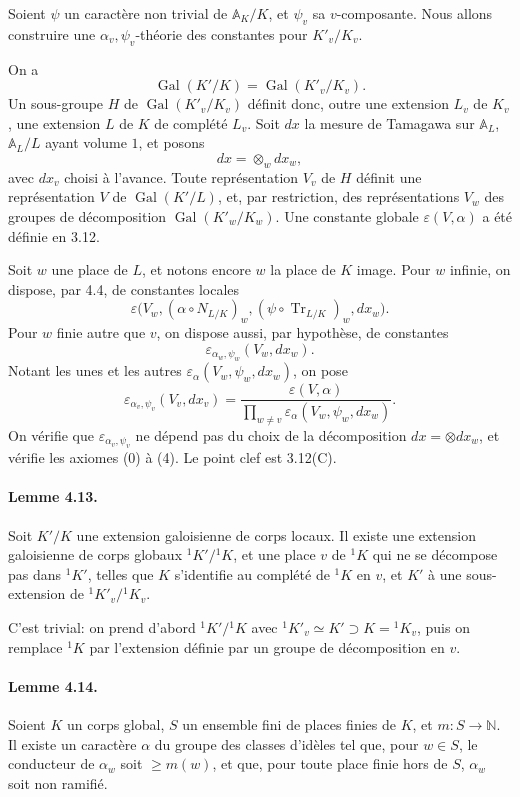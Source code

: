 \documentclass[10pt,letterpaper]{article}
\newcommand{\Gal}{\operatorname{Gal}}
\newcommand{\Tr}{\operatorname{Tr}}
\providecommand{\Gal}{\operatorname{Gal}}
\providecommand{\Gal}{\operatorname{Gal}}
\providecommand{\Tr}{\operatorname{Tr}}
\providecommand{\Gal}{\operatorname{Gal}}
\providecommand{\Tr}{\operatorname{Tr}}
\providecommand{\Gal}{\operatorname{Gal}}
\providecommand{\Tr}{\operatorname{Tr}}
\begin{document}
Soient \(\psi\) un caractère non trivial de \(\mathbb A_K/K\), et \(\psi_v\) sa \(v\)-composante. Nous allons construire une \(\alpha_v,\psi_v\)-théorie des constantes pour \(K'_v/K_v\).

On a
\[
\Gal(K'/K)=\Gal(K'_v/K_v).
\]
Un sous-groupe \(H\) de \(\Gal(K'_v/K_v)\) définit donc, outre une extension \(L_v\) de \(K_v\), une extension \(L\) de \(K\) de complété \(L_v\). Soit \(dx\) la mesure de Tamagawa sur \(\mathbb A_L\), \(\mathbb A_L/L\) ayant volume \(1\), et posons
\[
dx=\otimes_w dx_w,
\]
avec \(dx_v\) choisi à l'avance. Toute représentation \(V_v\) de \(H\) définit une représentation \(V\) de \(\Gal(K'/L)\), et, par restriction, des représentations \(V_w\) des groupes de décomposition \(\Gal(K'_w/K_w)\). Une constante globale \(\varepsilon(V,\alpha)\) a été définie en 3.12.

Soit \(w\) une place de \(L\), et notons encore \(w\) la place de \(K\) image. Pour \(w\) infinie, on dispose, par 4.4, de constantes locales
\[
\varepsilon\bigl(V_w,(\alpha\circ N_{L/K})_w,
(\psi\circ\Tr_{L/K})_w,dx_w\bigr).
\]
Pour \(w\) finie autre que \(v\), on dispose aussi, par hypothèse, de constantes
\[
\varepsilon_{\alpha_w,\psi_w}(V_w,dx_w).
\]
Notant les unes et les autres \(\varepsilon_\alpha(V_w,\psi_w,dx_w)\), on pose
\[
\varepsilon_{\alpha_v,\psi_v}(V_v,dx_v)
=
\frac{\varepsilon(V,\alpha)}
{\displaystyle\prod_{w\ne v}\varepsilon_\alpha(V_w,\psi_w,dx_w)}.
\]
On vérifie que \(\varepsilon_{\alpha_v,\psi_v}\) ne dépend pas du choix de la décomposition \(dx=\otimes dx_w\), et vérifie les axiomes (0) à (4). Le point clef est 3.12(C).

\paragraph{Lemme 4.13.} Soit \(K'/K\) une extension galoisienne de corps locaux. Il existe une extension galoisienne de corps globaux \(^{1}K'/{}^{1}K\), et une place \(v\) de \(^{1}K\) qui ne se décompose pas dans \(^{1}K'\), telles que \(K\) s'identifie au complété de \(^{1}K\) en \(v\), et \(K'\) à une sous-extension de \(^{1}K'_v/{}^{1}K_v\).

C'est trivial: on prend d'abord \(^{1}K'/{}^{1}K\) avec \(^{1}K'_v\simeq K'\supset K={}^{1}K_v\), puis on remplace \(^{1}K\) par l'extension définie par un groupe de décomposition en \(v\).

\paragraph{Lemme 4.14.} Soient \(K\) un corps global, \(S\) un ensemble fini de places finies de \(K\), et \(m:S\to\mathbb N\). Il existe un caractère \(\alpha\) du groupe des classes d'idèles tel que, pour \(w\in S\), le conducteur de \(\alpha_w\) soit \(\ge m(w)\), et que, pour toute place finie hors de \(S\), \(\alpha_w\) soit non ramifié.
\end{document}
